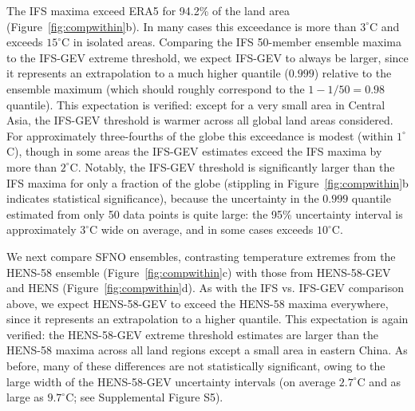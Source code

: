 \documentclass[draft]{agujournal2019}
\begin{document}

The IFS maxima exceed ERA5 for 94.2\% of the land area (Figure~\ref{fig:compwithin}b). In many cases this exceedance is more than $3^\circ$C and exceeds $15^\circ$C in isolated areas. Comparing the IFS 50-member ensemble maxima to the IFS-GEV extreme threshold, we expect IFS-GEV to always be larger, since it represents an extrapolation to a much higher quantile ($0.999$) relative to the ensemble maximum (which should roughly correspond to the $1 - 1/50 = 0.98$ quantile). This expectation is verified: except for a very small area in Central Asia, the IFS-GEV threshold is warmer across all global land areas considered. For approximately three-fourths of the globe this exceedance is modest (within $1^\circ$C), though in some areas the IFS-GEV estimates exceed the IFS maxima by more than $2^\circ$C. Notably, the IFS-GEV threshold is significantly larger than the IFS maxima for only a fraction of the globe (stippling in Figure~\ref{fig:compwithin}b indicates statistical significance), because the uncertainty in the $0.999$ quantile estimated from only 50 data points is quite large: the 95\% uncertainty interval is approximately $3^\circ$C wide on average, and in some cases exceeds $10^\circ$C.

We next compare SFNO ensembles, contrasting temperature extremes from the HENS-58 ensemble (Figure~\ref{fig:compwithin}c) with those from HENS-58-GEV and HENS (Figure~\ref{fig:compwithin}d). 
As with the IFS vs. IFS-GEV comparison above, we expect HENS-58-GEV to exceed the HENS-58 maxima everywhere, since it represents an extrapolation to a higher quantile. This expectation is again verified: the HENS-58-GEV extreme threshold estimates are larger than the HENS-58 maxima across all land regions except a small area in eastern China. As before, many of these differences are not statistically significant, owing to the large width of the HENS-58-GEV uncertainty intervals (on average $2.7^\circ$C and as large as $9.7^\circ$C; see Supplemental Figure S5).
\end{document}
